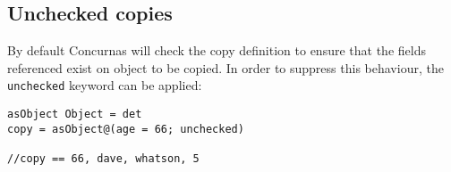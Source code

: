 \documentclass[conc-doc]{subfiles}
\begin{document}
\subsection{Unchecked copies}
By default Concurnas will check the copy definition to ensure that the fields referenced exist on object to be copied. In order to suppress this behaviour, the \lstinline{unchecked} keyword can be applied:
\begin{lstlisting}
asObject Object = det
copy = asObject@(age = 66; unchecked)

//copy == 66, dave, whatson, 5
\end{lstlisting}
\end{document}
